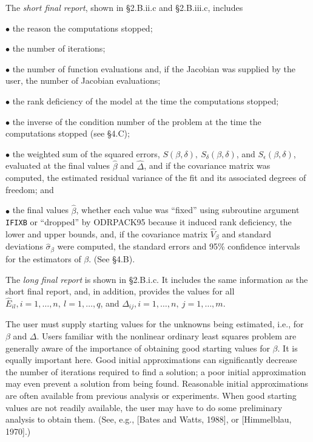 \noindent The {\it short final report}, shown in \S 2.B.ii.c and \S 2.B.iii.c, includes
\item{$\bullet$} the reason the computations stopped;
\item{$\bullet$} the number of iterations;
\item{$\bullet$} the number of function evaluations and, if the Jacobian was supplied by the user, the number of Jacobian evaluations;
\item{$\bullet$} the rank deficiency of the model at the time the computations stopped;
\item{$\bullet$} the inverse of the condition number of the problem at the time the computations stopped (see \S 4.C);
\item{$\bullet$} the weighted sum of the squared errors,
$S(\beta,\delta),\ S_{\delta}(\beta,\delta)$, and $S_{\epsilon}(\beta,\delta)$, evaluated at the final values $\hat{\beta}$ and $\hat{\Delta}$, and if the covariance matrix was computed, the estimated residual variance of the fit and its associated degrees of freedom; and
\item{$\bullet$} the final values $\hat{\beta}$, whether each value was
``fixed'' using subroutine argument {\tt IFIXB} or ``dropped'' by ODRPACK95
because it induced rank deficiency, the lower and upper bounds, and,
if the covariance matrix $\hat{V}_\beta$ and standard deviations
$\hat{\sigma}_\beta$ were computed, the standard errors and 95\%
confidence intervals for the estimators of $\beta$. (See \S 4.B).

\noindent The {\it long final report} is shown in \S 2.B.i.c. It includes the same information as the short final report, and, in addition, provides the values for all $\hat{E}_{il},i=1,\ldots,n,\ l=1,\ldots,q$, and
$\hat{\Delta}_{ij},i=1,\ldots,n,\ j=1,\ldots,m$.

\bigskip{}
\medskip
\noindent The user must supply starting values for the unknowns being estimated, i.e., for $\beta$ and $\Delta$. Users familiar with the nonlinear ordinary least squares problem are generally aware of the importance of obtaining good starting values for $\beta$. It is equally important here. Good initial approximations can significantly decrease the number of iterations required to find a solution; a poor initial approximation may even prevent a solution from being found. Reasonable initial approximations are often available from previous analysis or experiments. When good starting values are not readily available, the user may have to do some preliminary analysis to obtain them. (See, e.g., [Bates and Watts, 1988], or [Himmelblau, 1970].)

